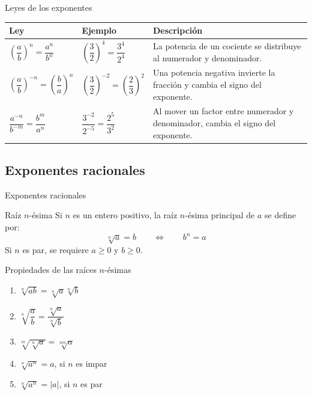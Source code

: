 \documentclass[10pt,handout,aspectratio=169]{beamer}
\begin{document}
	\begin{frame}{Leyes de los exponentes}
		\small
		\begin{tabular}{>{\raggedright\arraybackslash}p{} >{\raggedright\arraybackslash}p{} >{\raggedright\arraybackslash}p{}}
			\toprule
			\textbf{Ley} & \textbf{Ejemplo} & \textbf{Descripción} \\
			\midrule
			$\left(\dfrac{a}{b}\right)^n=\dfrac{a^n}{b^n}$ &
			$\left(\dfrac{3}{2}\right)^4=\dfrac{3^4}{2^4}$ &
			La potencia de un cociente se distribuye al numerador y denominador. \\[0.5em]
			
			$\left(\dfrac{a}{b}\right)^{-n}=\left(\dfrac{b}{a}\right)^n$ &
			$\left(\dfrac{3}{2}\right)^{-2}=\left(\dfrac{2}{3}\right)^2$ &
			Una potencia negativa invierte la fracción y cambia el signo del exponente. \\[0.5em]
			
			$\dfrac{a^{-n}}{b^{-m}}=\dfrac{b^m}{a^n}$ &
			$\dfrac{3^{-2}}{2^{-5}}=\dfrac{2^5}{3^2}$ &
			Al mover un factor entre numerador y denominador, cambia el signo del exponente. \\
			\bottomrule
		\end{tabular}
	\end{frame}
	
	\subsection{Exponentes racionales}
	
	\begin{frame}{Exponentes racionales}
		\begin{block}{Raíz $n$-ésima}
			Si $n$ es un entero positivo, la raíz $n$-ésima principal de $a$ se define por:
			\[
			\sqrt[n]{a}=b
			\qquad \Longleftrightarrow \qquad
			b^{n}=a
			\]
			Si $n$ es par, se requiere $a\geq 0$ y $b\geq 0$.
		\end{block}
		
		\begin{block}{Propiedades de las raíces $n$-ésimas}
			\begin{enumerate}
				\item $\sqrt[n]{ab}=\sqrt[n]{a}\sqrt[n]{b}$
				\item $\sqrt[n]{\dfrac{a}{b}}=\dfrac{\sqrt[n]{a}}{\sqrt[n]{b}}$
				\item $\sqrt[m]{\sqrt[n]{a}}=\sqrt[mn]{a}$
				\item $\sqrt[n]{a^{n}}=a$, si $n$ es impar
				\item $\sqrt[n]{a^{n}}=|a|$, si $n$ es par
			\end{enumerate}
		\end{block}
	\end{frame}
	
\end{document}
